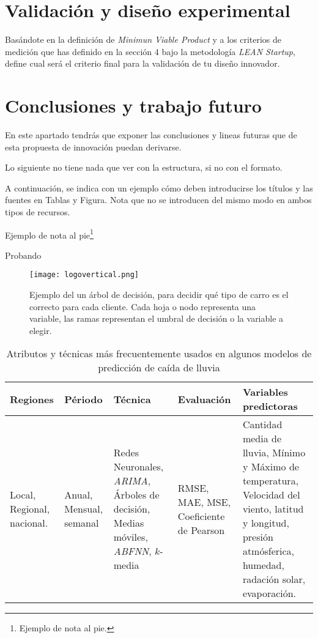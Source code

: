 \documentclass[12pt,a4paper]{proyectoinnovacion}
\begin{document}
\section{Validación y diseño experimental}

Basándote en la definición de \textit{Minimun Viable Product} y a los criterios de medición que has definido en la sección 4 bajo la metodología \textit{LEAN Startup}, define cual será el criterio final para la validación de tu diseño innovador. 


\section{Conclusiones y trabajo futuro}

En este apartado tendrás que exponer las conclusiones y lineas futuras que de esta propuesta de innovación puedan derivarse.

Lo siguiente no tiene nada que ver con la estructura, si no con el formato. 

A continuación, se indica con un ejemplo cómo deben introducirse los títulos y las fuentes en Tablas y Figura. Nota que no se introducen del mismo modo en ambos tipos de recursos.

Ejemplo de nota al pie\footnote[1]{Ejemplo de nota al pie.}

Probando 


\begin{figure}
  \label{fig:logovertical}
  \centering
  \caption[Proceso de percepción de objetos.]{Ejemplo del un árbol de decisión, para decidir qué tipo de carro es el correcto para cada cliente. Cada hoja o nodo representa una variable, las ramas representan el umbral de decisión o la variable a elegir.}
  \texttt{[image: logovertical.png]}
\end{figure}

\begin{table}
  \label{tab:atributos}
  \caption{Atributos y técnicas más frecuentemente usados en algunos modelos de predicción de caída de lluvia}
  \centering
  \begin{tabular}{p{0.2\tablelength}p{0.2\tablelength}p{0.4\tablelength}p{0.4\tablelength}p{0.8\tablelength}}
    \toprule
    Regiones & Périodo & Técnica & Evaluación & Variables predictoras \\
    \midrule
    Local, Regional, nacional. 
    & Anual, Mensual, semanal 
    & Redes Neuronales, \textit{ARIMA}, Árboles de decisión, Medias móviles, \textit{ABFNN}, $k$-media
    & RMSE, MAE, MSE, Coeficiente de Pearson 
    & Cantidad media de lluvia, Mínimo y Máximo de temperatura, Velocidad del viento, latitud y longitud, presión atmósferica, humedad, radación solar, evaporación.\\	  
    \bottomrule
  \end{tabular}
\end{table}
\end{document}

